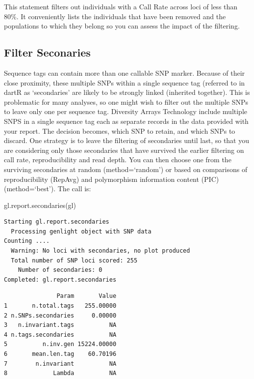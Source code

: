 \documentclass[
  letterpaper,
  DIV=11,
  numbers=noendperiod]{scrreprt}
\newenvironment{Shaded}{\begin{snugshade}}{\end{snugshade}}
\newcommand{\FunctionTok}[1]{\textcolor[rgb]{0.02,0.16,0.49}{#1}}
\newcommand{\NormalTok}[1]{\textcolor[rgb]{0.00,0.44,0.13}{#1}}
\begin{document}
This statement filters out individuals with a Call Rate across loci of
less than 80\%. It conveniently lists the individuals that have been
removed and the populations to which they belong so you can assess the
impact of the filtering.

\hypertarget{filter-seconaries}{%
\subsection{Filter Seconaries}\label{filter-seconaries}}

Sequence tags can contain more than one callable SNP marker. Because of
their close proximity, these multiple SNPs within a single sequence tag
(referred to in dartR as `secondaries' are likely to be strongly linked
(inherited together). This is problematic for many analyses, so one
might wish to filter out the multiple SNPs to leave only one per
sequence tag. Diversity Arrays Technology include multiple SNPS in a
single sequence tag each as separate records in the data provided with
your report. The decision becomes, which SNP to retain, and which SNPs
to discard. One strategy is to leave the filtering of secondaries until
last, so that you are considering only those secondaries that have
survived the earlier filtering on call rate, reproducibility and read
depth. You can then choose one from the surviving secondaries at random
(method=`random') or based on comparisons of reproducibility (RepAvg)
and polymorphism information content (PIC) (method=`best'). The call is:

\begin{Shaded}
\begin{Highlighting}[]
\FunctionTok{gl.report.secondaries}\NormalTok{(gl)}
\end{Highlighting}
\end{Shaded}

\begin{verbatim}
Starting gl.report.secondaries 
  Processing genlight object with SNP data
Counting ....
  Warning: No loci with secondaries, no plot produced
  Total number of SNP loci scored: 255 
    Number of secondaries: 0 
Completed: gl.report.secondaries 
\end{verbatim}

\begin{verbatim}
               Param       Value
1       n.total.tags   255.00000
2 n.SNPs.secondaries     0.00000
3   n.invariant.tags          NA
4 n.tags.secondaries          NA
5          n.inv.gen 15224.00000
6       mean.len.tag    60.70196
7        n.invariant          NA
8             Lambda          NA
\end{verbatim}
\end{document}
